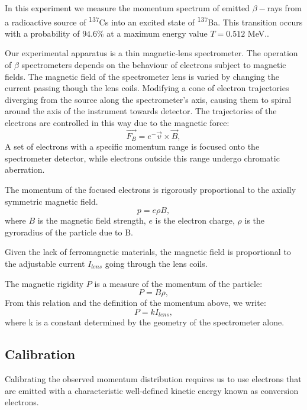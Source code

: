 \documentclass[10pt, a4paper]{article}
\begin{document}
\begin{multicols}{2}
In this experiment we measure the momentum spectrum of emitted $\beta-$rays from a radioactive source of \textsuperscript{137}Cs into an excited state of \textsuperscript{137}Ba. This transition occurs with a probability of $94.6\%$ at a maximum energy value $T = 0.512$ MeV.\cite{SPA}.

Our experimental apparatus is a thin magnetic-lens spectrometer. 
The operation of $\beta$ spectrometers depends on the behaviour of electrons subject to magnetic fields. The magnetic field of the spectrometer lens is varied by changing the current passing though the lens coils.
Modifying a cone of electron trajectories diverging from the source along the spectrometer's axis, causing them to spiral around the axis of the instrument towards detector\cite{SPA}. 
The trajectories of the electrons are controlled in this way due to the magnetic force: 
\begin{equation}\vec{F_{B}} = e^{-} \vec{v} \times \vec{B},
\end{equation} 
A set of electrons with a specific momentum range is focused onto the spectrometer detector, while electrons outside this range undergo chromatic aberration. 

The momentum of the focused electrons is rigorously proportional to the axially symmetric magnetic field.
\begin{equation}p = e \rho B,
\end{equation} 
where $B$ is the magnetic field strength, $e$ is the electron charge, $\rho$ is the gyroradius of the particle due to B.

Given the lack of ferromagnetic materials, the magnetic field is proportional to the adjustable current $I_{lens}$ going through the lens coils.\cite{QH} 

The magnetic rigidity $P$ is a measure of the momentum of the particle\cite{Wikipedia-Rigidity}:
\begin{equation}P = B \rho,
\end{equation}
From this relation and the definition of the momentum above, we write:
\begin{equation}P = kI_{lens},
\end{equation}
where k is a constant determined by the geometry of the spectrometer alone\cite{QH}.
\subsection{Calibration}
Calibrating the observed momentum distribution requires us to use electrons that are emitted with a characteristic well-defined kinetic energy known as conversion electrons\cite{SPA}.


\end{multicols}
\end{document}
